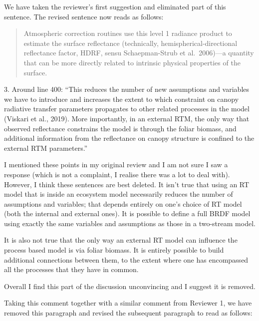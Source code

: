\documentclass{article}
\newenvironment{reviewer}{\par\color{Mahogany}\vspace{6pt}}{\par\vspace{6pt}}
\begin{document}
We have taken the reviewer's first suggestion and eliminated part of this sentence.
The revised sentence now reads as follows:

\begin{quote}
  Atmospheric correction routines use this level 1 radiance product to estimate the surface reflectance (technically, hemispherical-directional reflectance factor, HDRF, sensu Schaepman-Strub et al.\ 2006)---a quantity that can be more directly related to intrinsic physical properties of the surface.
\end{quote}

\begin{reviewer}
  3. Around line 400: ``This reduces the number of new assumptions and variables we have to introduce and increases the extent to which constraint on canopy radiative transfer parameters propagates to other related processes in the model (Viskari et al., 2019). More importantly, in an external RTM, the only way that observed reflectance constrains the model is through the foliar biomass, and additional information from the reflectance on canopy structure is confined to the external RTM parameters.''

  I mentioned these points in my original review and I am not sure I saw a response (which is not a complaint, I realise there was a lot to deal with). However, I think these sentences are best deleted. It isn't true that using an RT model that is inside an ecosystem model necessarily reduces the number of assumptions and variables; that depends entirely on one's choice of RT model (both the internal and external ones). It is possible to define a full BRDF model using exactly the same variables and assumptions as those in a two-stream model.

  It is also not true that the only way an external RT model can influence the process based model is via foliar biomass. It is entirely possible to build additional connections between them, to the extent where one has encompassed all the processes that they have in common.

  Overall I find this part of the discussion unconvincing and I suggest it is removed.
\end{reviewer}

Taking this comment together with a similar comment from Reviewer 1, we have removed this paragraph and revised the subsequent paragraph to read as follows:
\end{document}
